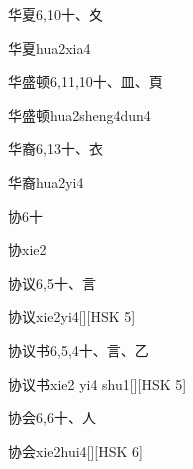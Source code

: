 \begin{Entry}{华夏}{6,10}{⼗、⼢}
  \begin{Phonetics}{华夏}{hua2xia4}
  \end{Phonetics}
\end{Entry}

\begin{Entry}{华盛顿}{6,11,10}{⼗、⽫、⾴}
  \begin{Phonetics}{华盛顿}{hua2sheng4dun4}
  \end{Phonetics}
\end{Entry}

\begin{Entry}{华裔}{6,13}{⼗、⾐}
  \begin{Phonetics}{华裔}{hua2yi4}
  \end{Phonetics}
\end{Entry}

\begin{Entry}{协}{6}{⼗}
  \begin{Phonetics}{协}{xie2}
  \end{Phonetics}
\end{Entry}

\begin{Entry}{协议}{6,5}{⼗、⾔}
  \begin{Phonetics}{协议}{xie2yi4}[][HSK 5]
  \end{Phonetics}
\end{Entry}

\begin{Entry}{协议书}{6,5,4}{⼗、⾔、⼄}
  \begin{Phonetics}{协议书}{xie2 yi4 shu1}[][HSK 5]
  \end{Phonetics}
\end{Entry}

\begin{Entry}{协会}{6,6}{⼗、⼈}
  \begin{Phonetics}{协会}{xie2hui4}[][HSK 6]
  \end{Phonetics}
\end{Entry}

